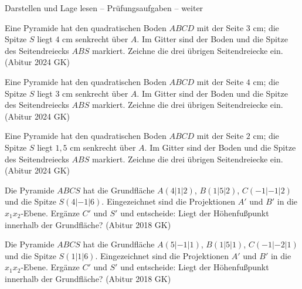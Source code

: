 \begin{aufgabe}{Darstellen und Lage lesen – Prüfungsaufgaben – weiter}
\begin{teile}
\teil Eine Pyramide hat den quadratischen Boden $ABCD$ mit der Seite $3$ cm; die Spitze $S$ liegt $4$ cm senkrecht über $A$. Im Gitter sind der Boden und die Spitze des Seitendreiecks $ABS$ markiert. Zeichne die drei übrigen Seitendreiecke ein. \hfill (Abitur 2024 GK)

\begin{ksys}[xmin=-5,xmax=9,ymin=-5,ymax=9]      \end{ksys}
\teil Eine Pyramide hat den quadratischen Boden $ABCD$ mit der Seite $4$ cm; die Spitze $S$ liegt $3$ cm senkrecht über $A$. Im Gitter sind der Boden und die Spitze des Seitendreiecks $ABS$ markiert. Zeichne die drei übrigen Seitendreiecke ein. \hfill (Abitur 2024 GK)

\begin{ksys}[xmin=-4,xmax=10,ymin=-4,ymax=10]      \end{ksys}
\teil Eine Pyramide hat den quadratischen Boden $ABCD$ mit der Seite $2$ cm; die Spitze $S$ liegt $1{,}5$ cm senkrecht über $A$. Im Gitter sind der Boden und die Spitze des Seitendreiecks $ABS$ markiert. Zeichne die drei übrigen Seitendreiecke ein. \hfill (Abitur 2024 GK)

\begin{ksys}[xmin=-2.5,xmax=5.5,ymin=-2.5,ymax=5.5]      \end{ksys}
\teil Die Pyramide $ABCS$ hat die Grundfläche $A(4 | 1 | 2)$, $B(1 | 5 | 2)$, $C(-1 | -1 | 2)$ und die Spitze $S(4 | -1 | 6)$. Eingezeichnet sind die Projektionen $A'$ und $B'$ in die $x_1x_2$-Ebene. Ergänze $C'$ und $S'$ und entscheide: Liegt der Höhenfußpunkt innerhalb der Grundfläche? \hfill (Abitur 2018 GK)

\begin{ksys3}   \end{ksys3}
\teil Die Pyramide $ABCS$ hat die Grundfläche $A(5 | -1 | 1)$, $B(1 | 5 | 1)$, $C(-1 | -2 | 1)$ und die Spitze $S(1 | 1 | 6)$. Eingezeichnet sind die Projektionen $A'$ und $B'$ in die $x_1x_2$-Ebene. Ergänze $C'$ und $S'$ und entscheide: Liegt der Höhenfußpunkt innerhalb der Grundfläche? \hfill (Abitur 2018 GK)

\begin{ksys3}   \end{ksys3}
\end{teile}
\end{aufgabe}

